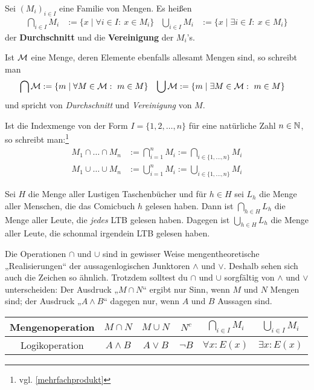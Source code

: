 \begin{defin} \label{def:mehrfachcapcup}
    Sei $(M_i)_{i\in I}$ eine Familie von Mengen. Es heißen
    \begin{align*}
        \bigcap_{i\in I} M_i &:= \{x \mid \forall i\in I:\ x\in M_i\} & \bigcup_{i\in I}M_i &:= \{x \mid \exists i\in I:\ x\in M_i\}
    \end{align*}
    der \textbf{Durchschnitt} und die \textbf{Vereinigung} der $M_i$'s.
    
    Ist $\mathcal M$ eine Menge, deren Elemente ebenfalls allesamt Mengen sind, so schreibt man
    \begin{align*}
        \bigcap \mathcal M & := \{ m \mid \forall M\in \mathcal M:\ m\in M \} & \bigcup \mathcal M & := \{m\mid \exists M\in \mathcal M:\ m\in M \}
    \end{align*}
    und spricht von \emph{Durchschnitt} und \emph{Vereinigung} von $M$.
\end{defin}


\begin{nota} \label{alternativmehrfachcapcup}
    Ist die Indexmenge von der Form $I=\{1,2,\dots,n\}$ für eine natürliche Zahl $n\in \mathbb N$, so schreibt man:\footnote{vgl. \cref{mehrfachprodukt}}
    \begin{align*}
        M_1\cap \ldots\cap M_n & := \bigcap_{i=1}^n M_i := \bigcap_{i\in \{1,\dots , n\}} M_i\\
        M_1\cup \ldots\cup M_n & := \bigcup_{i=1}^n M_i := \bigcup_{i\in \{1,\dots , n\}} M_i
    \end{align*}
\end{nota}


\begin{bsp}
    Sei $H$ die Menge aller Lustigen Taschenbücher und für $h\in H$ sei $L_h$ die Menge aller Menschen, die das Comicbuch $h$ gelesen haben. Dann ist $\bigcap_{h\in H} L_h$ die Menge aller Leute, die \emph{jedes} LTB gelesen haben. Dagegen ist $\bigcup_{h\in H} L_h$ die Menge aller Leute, die schonmal irgendein LTB gelesen haben.
\end{bsp}


\begin{bem}
    Die Operationen $\cap$ und $\cup$ sind in gewisser Weise mengentheoretische „Realisierungen“ der aussagenlogischen Junktoren $\land$ und $\lor$. Deshalb sehen sich auch die Zeichen so ähnlich. Trotzdem solltest du $\cap$ und $\cup$ sorgfältig von $\land$ und $\lor$ unterscheiden: Der Ausdruck „$M\cap N$“ ergibt nur Sinn, wenn $M$ und $N$ Mengen sind; der Ausdruck „$A\wedge B$“ dagegen nur, wenn $A$ und $B$ Aussagen sind.
    \begin{center}
    \begin{tabular}{c|c|c|c|c|c}
        Mengenoperation & $M\cap N$ & $M\cup N$ & $N^c$ & $\bigcap_{i\in I} M_i$ & $\bigcup_{i\in I} M_i$ \\ \midrule
        Logikoperation & $A\land B$ & $A \lor B$ & $\neg B$ & $\forall x: E(x)$ & $\exists x: E(x)$
    \end{tabular}
    \end{center}
\end{bem}


